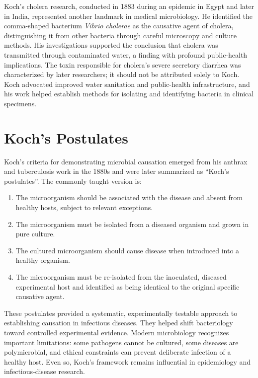 Koch's cholera research, conducted in 1883 during an epidemic in Egypt and later in India, represented another landmark in medical microbiology. He identified the comma-shaped bacterium \emph{Vibrio cholerae} as the causative agent of cholera, distinguishing it from other bacteria through careful microscopy and culture methods. His investigations supported the conclusion that cholera was transmitted through contaminated water, a finding with profound public-health implications. The toxin responsible for cholera's severe secretory diarrhea was characterized by later researchers; it should not be attributed solely to Koch. Koch advocated improved water sanitation and public-health infrastructure, and his work helped establish methods for isolating and identifying bacteria in clinical specimens.

\section{Koch's Postulates}

Koch's criteria for demonstrating microbial causation emerged from his anthrax and tuberculosis work in the 1880s and were later summarized as ``Koch's postulates''. The commonly taught version is:

\begin{enumerate}
\item The microorganism should be associated with the disease and absent from healthy hosts, subject to relevant exceptions.
\item The microorganism must be isolated from a diseased organism and grown in pure culture.
\item The cultured microorganism should cause disease when introduced into a healthy organism.
\item The microorganism must be re-isolated from the inoculated, diseased experimental host and identified as being identical to the original specific causative agent.
\end{enumerate}

These postulates provided a systematic, experimentally testable approach to establishing causation in infectious diseases. They helped shift bacteriology toward controlled experimental evidence. Modern microbiology recognizes important limitations: some pathogens cannot be cultured, some diseases are polymicrobial, and ethical constraints can prevent deliberate infection of a healthy host. Even so, Koch's framework remains influential in epidemiology and infectious-disease research.

